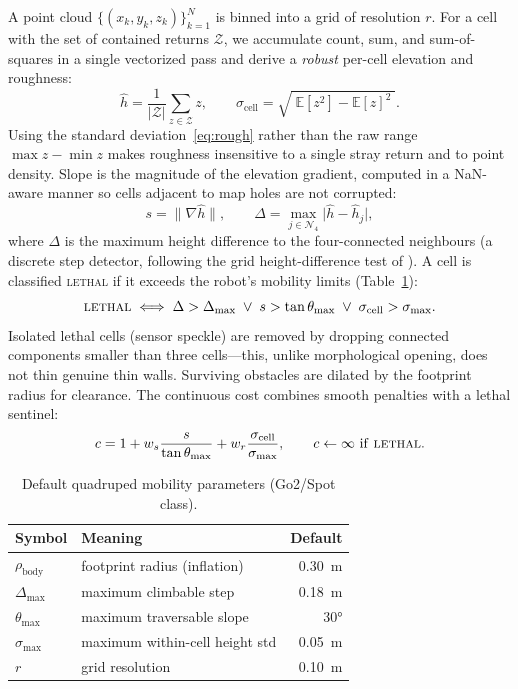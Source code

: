 \documentclass[11pt]{article}
\begin{document}
A point cloud $\{(x_k,y_k,z_k)\}_{k=1}^{N}$ is binned into a grid of resolution
$r$. For a cell with the set of contained returns $\mathcal{Z}$, we accumulate
count, sum, and sum-of-squares in a single vectorized pass and derive a
\emph{robust} per-cell elevation and roughness:
\begin{equation}
\hat h = \frac{1}{|\mathcal{Z}|}\sum_{z\in\mathcal{Z}} z, \qquad
\sigma_{\text{cell}} = \sqrt{\;\mathbb{E}[z^2]-\mathbb{E}[z]^2\;}.
\label{eq:rough}
\end{equation}
Using the standard deviation~\eqref{eq:rough} rather than the raw range
$\max z-\min z$ makes roughness insensitive to a single stray return and to point
density. Slope is the magnitude of the elevation gradient, computed in a
NaN-aware manner so cells adjacent to map holes are not corrupted:
\begin{equation}
s = \lVert \nabla \hat h \rVert,\qquad
\Delta = \max_{j\in\mathcal{N}_4} \lvert \hat h - \hat h_j\rvert,
\label{eq:slopestep}
\end{equation}
where $\Delta$ is the maximum height difference to the four-connected neighbours
(a discrete step detector, following the grid height-difference test of
\cite{refpaper}). A cell is classified \textsc{lethal} if it exceeds the robot's
mobility limits (Table~\ref{tab:params}):
\begin{equation}
\textsc{lethal} \iff \Delta > \Delta_{\max} \;\lor\; s > \tan\theta_{\max}
\;\lor\; \sigma_{\text{cell}} > \sigma_{\max}.
\label{eq:lethal}
\end{equation}
Isolated lethal cells (sensor speckle) are removed by dropping connected
components smaller than three cells---this, unlike morphological opening, does not
thin genuine thin walls. Surviving obstacles are dilated by the footprint radius
for clearance. The continuous cost combines smooth penalties with a lethal
sentinel:
\begin{equation}
c = 1 + w_s\frac{s}{\tan\theta_{\max}} + w_r\frac{\sigma_{\text{cell}}}{\sigma_{\max}},
\qquad c \leftarrow \infty \text{ if \textsc{lethal}.}
\label{eq:cost}
\end{equation}

\begin{table}[t]
\centering
\caption{Default quadruped mobility parameters (Go2/Spot class).}
\label{tab:params}
\begin{tabular}{llr}
\toprule
Symbol & Meaning & Default \\
\midrule
$\rho_{\text{body}}$   & footprint radius (inflation) & \SI{0.30}{m} \\
$\Delta_{\max}$        & maximum climbable step       & \SI{0.18}{m} \\
$\theta_{\max}$        & maximum traversable slope    & \ang{30} \\
$\sigma_{\max}$        & maximum within-cell height std & \SI{0.05}{m} \\
$r$                    & grid resolution               & \SI{0.10}{m} \\
\bottomrule
\end{tabular}
\end{table}
\end{document}
